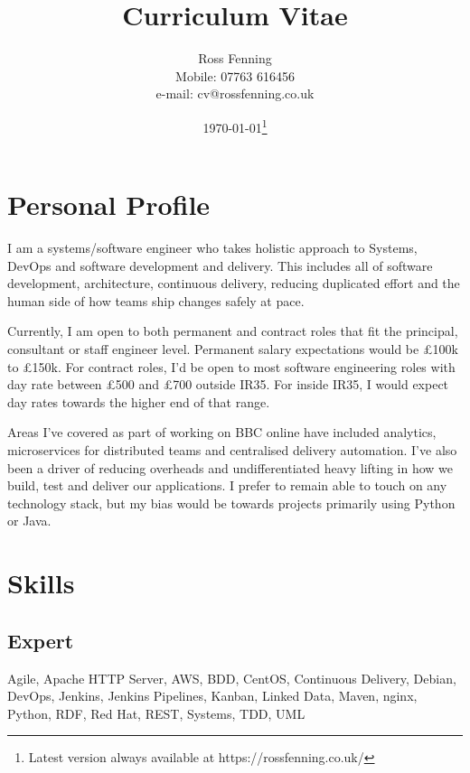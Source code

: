 \documentclass[10pt]{article}
\begin{document}
\title{\bf{Curriculum Vitae}}
\author{
  Ross Fenning\\
  Mobile: 07763 616456\\
  e-mail: cv@rossfenning.co.uk
}

\date{\today\footnote{Latest version always available at https://rossfenning.co.uk/}}
\maketitle

\vspace{-0.5cm}

\hrulefill

\section*{Personal Profile}

I am a systems/software engineer who takes holistic approach to
Systems, DevOps and software development and delivery.
This includes all of software development, architecture, continuous delivery,
reducing duplicated effort and the human side of how teams ship changes safely
at pace.

Currently, I am open to both permanent and contract roles that fit the
principal, consultant or staff engineer level.
Permanent salary expectations would be £100k to £150k.
For contract roles, I'd be open to most software
engineering roles with day rate between £500 and £700 outside IR35.
For inside IR35, I would expect day rates towards the higher end of that range.

Areas I've covered as part of working on BBC online have included analytics,
microservices for distributed teams and centralised delivery automation.
I've  also been a driver of reducing overheads and undifferentiated heavy
lifting in how we build, test and deliver our applications.
I prefer to remain able to touch on any technology stack, but my bias would
be towards projects primarily using Python or Java.


\section*{Skills}


\subsection*{Expert}

Agile, Apache HTTP Server, AWS, BDD, CentOS, Continuous Delivery, Debian, DevOps, Jenkins, Jenkins Pipelines, Kanban, Linked Data, Maven, nginx, Python, RDF, Red Hat, REST, Systems, TDD, UML
\end{document}
